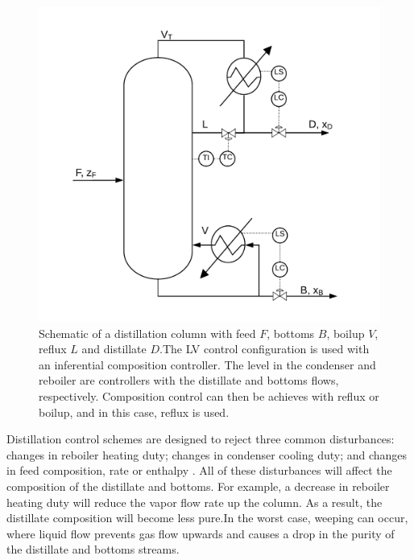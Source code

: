 \begin{figure}[t]
  \centering
  \includegraphics[height=0.3\textheight]{gfx/Chapter05/lv_configuration_inferential.png}
  \caption{Schematic of a distillation column with feed $F$, bottoms $B$, boilup $V$, reflux $L$ and distillate $D$.The  LV control configuration is used with an inferential composition controller. The level in the condenser and reboiler are controllers with the distillate and bottoms flows, respectively. Composition control can then be achieves with reflux or boilup, and in this case, reflux is used.}
  \label{lv_config}
\end{figure}

Distillation control schemes are designed to reject three common disturbances: changes in reboiler heating duty;  changes in condenser cooling duty; and changes in feed composition, rate or enthalpy \cite{Riggs2006}. All of these disturbances will affect the composition of the distillate and bottoms.  For example, a decrease in reboiler heating duty will reduce the vapor flow rate up the column.  As a result, the distillate composition will become less pure.\footnotemark   In the worst case, weeping can occur, where liquid flow prevents gas flow upwards and causes a drop in the purity of the distillate and bottoms streams. 

